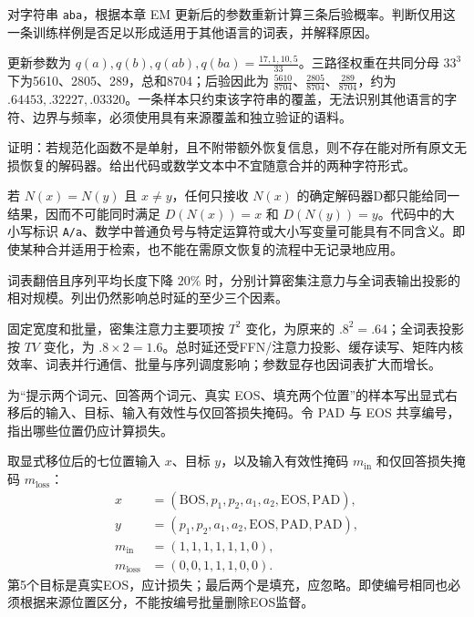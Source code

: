 \begin{exercises}
\begin{exercise}\optional 对字符串 \texttt{aba}，根据本章 EM 更新后的参数重新计算三条后验概率。判断仅用这一条训练样例是否足以形成适用于其他语言的词表，并解释原因。

\begin{solution}
更新参数为 $q(a),q(b),q(ab),q(ba)=\frac{17,1,10,5}{33}$。三路径权重在共同分母 $33^3$ 下为5610、2805、289，总和8704；后验因此为 $\frac{5610}{8704}$、$\frac{2805}{8704}$、$\frac{289}{8704}$，约为 $.64453,.32227,.03320$。一条样本只约束该字符串的覆盖，无法识别其他语言的字符、边界与频率，必须使用具有来源覆盖和独立验证的语料。
\end{solution}
\end{exercise}

\begin{exercise} 证明：若规范化函数不是单射，且不附带额外恢复信息，则不存在能对所有原文无损恢复的解码器。给出代码或数学文本中不宜随意合并的两种字符形式。

\begin{solution}
若 $N(x)=N(y)$ 且 $x\ne y$，任何只接收 $N(x)$ 的确定解码器D都只能给同一结果，因而不可能同时满足 $D(N(x))=x$ 和 $D(N(y))=y$。代码中的大小写标识 \texttt{A/a}、数学中普通负号与特定运算符或大小写变量可能具有不同含义。即使某种合并适用于检索，也不能在需原文恢复的流程中无记录地应用。
\end{solution}
\end{exercise}

\begin{exercise} 词表翻倍且序列平均长度下降 $20\%$ 时，分别计算密集注意力与全词表输出投影的相对规模。列出仍然影响总时延的至少三个因素。

\begin{solution}
固定宽度和批量，密集注意力主要项按 $T^2$ 变化，为原来的 $.8^2=.64$；全词表投影按 $TV$ 变化，为 $.8\times2=1.6$。总时延还受FFN/注意力投影、缓存读写、矩阵内核效率、词表并行通信、批量与序列调度影响；参数显存也因词表扩大而增长。
\end{solution}
\end{exercise}

\begin{exercise} 为“提示两个词元、回答两个词元、真实 EOS、填充两个位置”的样本写出显式右移后的输入、目标、输入有效性与仅回答损失掩码。令 PAD 与 EOS 共享编号，指出哪些位置仍应计算损失。

\begin{solution}
取显式移位后的七位置输入 $x$、目标 $y$，以及输入有效性掩码 $m_{\mathrm{in}}$ 和仅回答损失掩码 $m_{\mathrm{loss}}$：
\[
\begin{aligned}
x&=(\mathrm{BOS},p_1,p_2,a_1,a_2,\mathrm{EOS},\mathrm{PAD}),\\
y&=(p_1,p_2,a_1,a_2,\mathrm{EOS},\mathrm{PAD},\mathrm{PAD}),\\
m_{\mathrm{in}}&=(1,1,1,1,1,1,0),\\
m_{\mathrm{loss}}&=(0,0,1,1,1,0,0).
\end{aligned}
\]
第5个目标是真实EOS，应计损失；最后两个是填充，应忽略。即使编号相同也必须根据来源位置区分，不能按编号批量删除EOS监督。
\end{solution}
\end{exercise}


\end{exercises}
